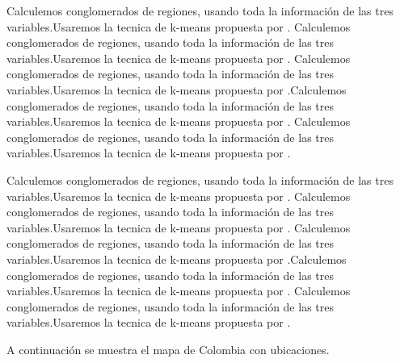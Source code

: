 \documentclass{article}
\begin{document}
Calculemos conglomerados de regiones, usando toda la información de las tres variables.Usaremos la tecnica de k-means propuesta por \cite{macqueen_methods_nodate}. Calculemos conglomerados de regiones, usando toda la información de las tres variables.Usaremos la tecnica de k-means propuesta por \cite{macqueen_methods_nodate}. Calculemos conglomerados de regiones, usando toda la información de las tres variables.Usaremos la tecnica de k-means propuesta por \cite{macqueen_methods_nodate}.Calculemos conglomerados de regiones, usando toda la información de las tres variables.Usaremos la tecnica de k-means propuesta por \cite{macqueen_methods_nodate}. Calculemos conglomerados de regiones, usando toda la información de las tres variables.Usaremos la tecnica de k-means propuesta por \cite{macqueen_methods_nodate}.

Calculemos conglomerados de regiones, usando toda la información de las tres variables.Usaremos la tecnica de k-means propuesta por \cite{macqueen_methods_nodate}. Calculemos conglomerados de regiones, usando toda la información de las tres variables.Usaremos la tecnica de k-means propuesta por \cite{macqueen_methods_nodate}. Calculemos conglomerados de regiones, usando toda la información de las tres variables.Usaremos la tecnica de k-means propuesta por \cite{macqueen_methods_nodate}.Calculemos conglomerados de regiones, usando toda la información de las tres variables.Usaremos la tecnica de k-means propuesta por \cite{macqueen_methods_nodate}. Calculemos conglomerados de regiones, usando toda la información de las tres variables.Usaremos la tecnica de k-means propuesta por \cite{macqueen_methods_nodate}.

A continuación se muestra el mapa de Colombia con ubicaciones.
\end{document}
